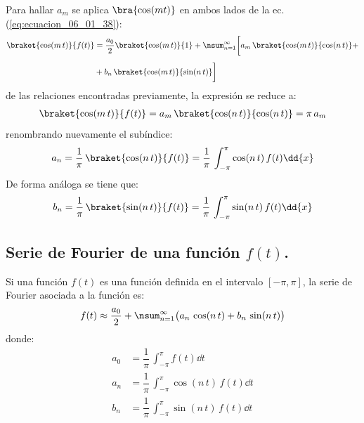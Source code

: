 Para hallar $a_{m}$ se aplica $\bra{\cos (mt)}$ en ambos lados de la ec. (\ref{eq:ecuacion_06_01_38}):
\begin{align}
\begin{aligned}
\braket{\cos(m \, t)}{f(t)} &= \dfrac{a_{0}}{2} \braket{\cos(m \, t)}{1} + \nsum_{n=1}^{\infty} \bigg[ a_{m} \, \braket{\cos (m \, t)}{\cos (n \, t)} + \\[0.5em]
&+ b_{n} \, \braket{\cos (m \, t)}{\sin (n \, t)} \bigg]
\end{aligned}
\label{eq:ecuacion_06_01_42}
\end{align}
de las relaciones encontradas previamente, la expresión se reduce a:
\begin{align}
\braket{\cos(m \, t)}{f(t)} = a_{m} \, \braket{\cos (n \, t)}{\cos (n \, t)} = \pi \, a_{m}
\label{eq:ecuacion_06_01_43}
\end{align}
renombrando nuevamente el subíndice:
\begin{align}
a_{n} = \dfrac{1}{\pi} \, \braket{\cos (n \, t)}{f(t)} = \dfrac{1}{\pi} \, \int_{-\pi}^{\pi} \cos (n \, t) \, f(t) \dd{x}
\label{eq:ecuacion_06_01_44}
\end{align}
De forma análoga se tiene que:
\begin{align}
b_{n} = \dfrac{1}{\pi} \, \braket{\sin (n \, t)}{f(t)} = \dfrac{1}{\pi} \, \int_{-\pi}^{\pi} \sin (n \, t) \, f(t) \dd{x}
\label{eq:ecuacion_06_01_45}
\end{align}

\subsection{Serie de Fourier de una función \texorpdfstring{$f(t)$}{f(t)}.}

Si una función $f(t)$ es una función definida en el intervalo $[-\pi, \pi]$, la serie de Fourier asociada a la función es:
\begin{align}
f(t) \approx \dfrac{a_{0}}{2} + \nsum_{n=1}^{\infty} \big( a_{n} \, \cos (n \, t) + b_{n} \, \sin (n \, t) \big)
\label{eq:ecuacion_06_01_46}
\end{align}
donde:
\begin{align}
a_{0} &= \dfrac{1}{\pi} \, \int_{-\pi}^{\pi} f(t) \dd{t} \label{eq:ecuacion_06_01_47} \\[0.5em]
a_{n} &= \dfrac{1}{\pi} \, \int_{-\pi}^{\pi} \cos (n \, t) \, f(t) \dd{t} \label{eq:ecuacion_06_01_48} \\[0.5em]
b_{n} &= \dfrac{1}{\pi} \, \int_{-\pi}^{\pi} \sin (n \, t) \, f(t) \dd{t} \label{eq:ecuacion_06_01_49}
\end{align}

